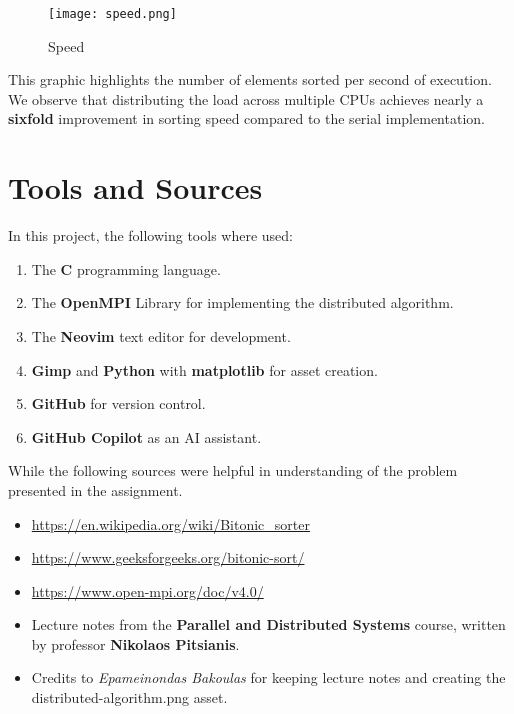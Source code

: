 \documentclass[12pt]{report}
\begin{document}
\begin{figure}[H]
    \centering
    \texttt{[image: speed.png]}
    \caption{Speed}
    \label{fig:enter-label}
\end{figure}

This graphic highlights the number of elements sorted per second of execution. We observe that distributing the load across multiple CPUs achieves nearly a \textbf{sixfold} improvement in sorting speed compared to the serial implementation.

\chapter{Tools and Sources}
In this project, the following tools where used:
\begin{enumerate}
\item The \textbf{C} programming language.
\item The \textbf{OpenMPI} Library for implementing the distributed algorithm.
\item The \textbf{Neovim} text editor for development.
\item \textbf{Gimp} and \textbf{Python} with \textbf{matplotlib} for asset creation.
\item \textbf{GitHub} for version control.
\item \textbf{GitHub Copilot} as an AI assistant.
\end{enumerate}
While the following sources were helpful in understanding of the problem presented in the assignment.
\begin{itemize}
\item \url{https://en.wikipedia.org/wiki/Bitonic_sorter}
\item \url{https://www.geeksforgeeks.org/bitonic-sort/}
\item \url{https://www.open-mpi.org/doc/v4.0/}
\item Lecture notes from the \textbf{Parallel and Distributed Systems} course, written by professor \textbf{Nikolaos Pitsianis}.
\item Credits to \textit{Epameinondas Bakoulas} for keeping lecture notes and creating the distributed-algorithm.png asset.
\end{itemize}
\end{document}
